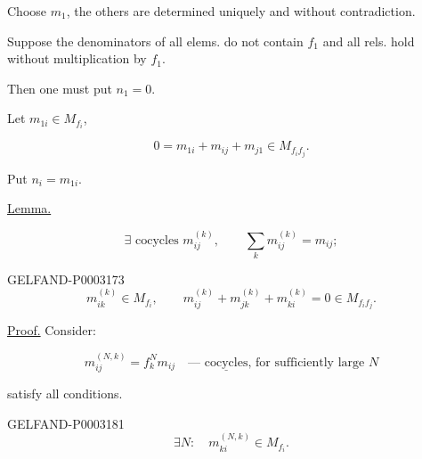 Choose $m_1$, the others are determined uniquely and without contradiction.

Suppose the denominators of all elems. do not contain $f_1$ and all rels. hold without multiplication by $f_1$.

Then one must put $n_1=0$.

Let $m_{1i}\in M_{f_i}$,

\begin{equation*}0=m_{1i}+m_{ij}+m_{j1}\in M_{f_i f_j}.\end{equation*}

Put $n_i=m_{1i}$.

\uline{Lemma.}

\begin{equation*}\exists\text{ cocycles }m_{ij}^{(k)},\qquad\sum_k m_{ij}^{(k)}=m_{ij};\end{equation*}

\begin{GelfandAdjacentEvidence}{GELFAND-P000317}{3}
\begin{equation*}m_{ik}^{(k)}\in M_{f_i},\qquad m_{ij}^{(k)}+m_{jk}^{(k)}+m_{ki}^{(k)}=0\in M_{f_i f_j}.\end{equation*}

\end{GelfandAdjacentEvidence}


\uline{Proof.} Consider:

\begin{equation*}m_{ij}^{(N, k)}=f_k^N m_{ij}\quad\text{--- }\underline{\text{cocycles}}\text{, for sufficiently large }N\end{equation*}



satisfy all conditions.

\begin{GelfandAdjacentEvidence}{GELFAND-P000318}{1}
\begin{equation*}\exists N:\quad m_{ki}^{(N, k)}\in M_{f_i}.\end{equation*}

\end{GelfandAdjacentEvidence}


